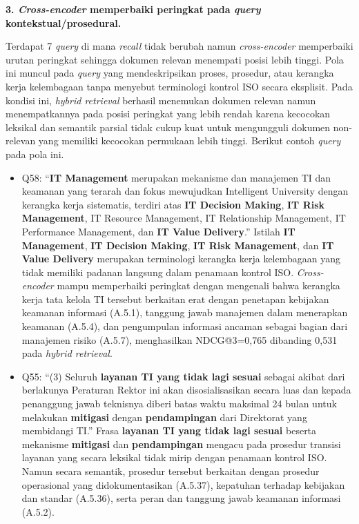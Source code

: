 \textbf{3. \textit{Cross-encoder} memperbaiki peringkat pada \textit{query} kontekstual/prosedural.}

Terdapat 7 \textit{query} di mana \textit{recall} tidak berubah namun \textit{cross-encoder} memperbaiki urutan peringkat sehingga dokumen relevan menempati posisi lebih tinggi. Pola ini muncul pada \textit{query} yang mendeskripsikan proses, prosedur, atau kerangka kerja kelembagaan tanpa menyebut terminologi kontrol ISO secara eksplisit. Pada kondisi ini, \textit{hybrid retrieval} berhasil menemukan dokumen relevan namun menempatkannya pada posisi peringkat yang lebih rendah karena kecocokan leksikal dan semantik parsial tidak cukup kuat untuk mengungguli dokumen non-relevan yang memiliki kecocokan permukaan lebih tinggi. Berikut contoh \textit{query} pada pola ini.

\begin{itemize}
	\item Q58: ``\textbf{IT Management} merupakan mekanisme dan manajemen TI dan keamanan yang terarah dan fokus mewujudkan Intelligent University dengan kerangka kerja sistematis, terdiri atas \textbf{IT Decision Making}, \textbf{IT Risk Management}, IT Resource Management, IT Relationship Management, IT Performance Management, dan \textbf{IT Value Delivery}.'' Istilah \textbf{IT Management}, \textbf{IT Decision Making}, \textbf{IT Risk Management}, dan \textbf{IT Value Delivery} merupakan terminologi kerangka kerja kelembagaan yang tidak memiliki padanan langsung dalam penamaan kontrol ISO. \textit{Cross-encoder} mampu memperbaiki peringkat dengan mengenali bahwa kerangka kerja tata kelola TI tersebut berkaitan erat dengan penetapan kebijakan keamanan informasi (A.5.1), tanggung jawab manajemen dalam menerapkan keamanan (A.5.4), dan pengumpulan informasi ancaman sebagai bagian dari manajemen risiko (A.5.7), menghasilkan NDCG@3=0{,}765 dibanding 0{,}531 pada \textit{hybrid retrieval}.
	\item Q55: ``(3) Seluruh \textbf{layanan TI yang tidak lagi sesuai} sebagai akibat dari berlakunya Peraturan Rektor ini akan disosialisasikan secara luas dan kepada penanggung jawab teknisnya diberi batas waktu maksimal 24 bulan untuk melakukan \textbf{mitigasi} dengan \textbf{pendampingan} dari Direktorat yang membidangi TI.'' Frasa \textbf{layanan TI yang tidak lagi sesuai} beserta mekanisme \textbf{mitigasi} dan \textbf{pendampingan} mengacu pada prosedur transisi layanan yang secara leksikal tidak mirip dengan penamaan kontrol ISO. Namun secara semantik, prosedur tersebut berkaitan dengan prosedur operasional yang didokumentasikan (A.5.37), kepatuhan terhadap kebijakan dan standar (A.5.36), serta peran dan tanggung jawab keamanan informasi (A.5.2).
\end{itemize}

